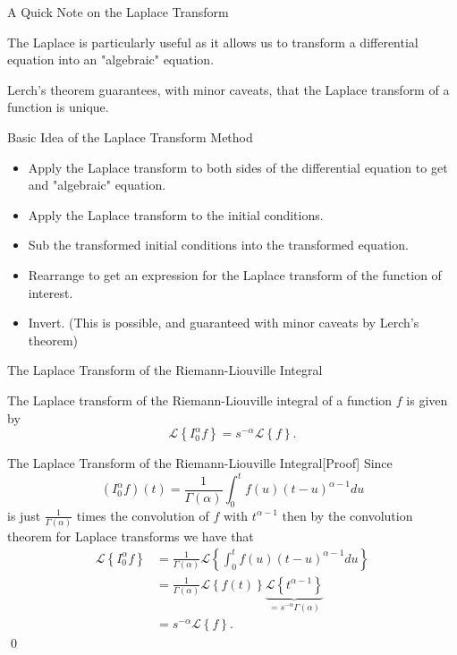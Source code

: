\documentclass[pdf]{beamer}
\begin{document}
\begin{frame}{A Quick Note on the Laplace Transform}
	
		
	
	The Laplace is particularly useful as it allows us to transform a differential equation into
	an "algebraic" equation. 
	
	Lerch's theorem guarantees, with minor caveats, that the Laplace transform of a function is
	unique.
	
\end{frame}

\begin{frame}{Basic Idea of the Laplace Transform Method}
	\begin{itemize}
		\item Apply the Laplace transform to both sides of the differential equation to get
		and "algebraic" equation.
		\item Apply the Laplace transform to the initial conditions. 
		\item Sub the transformed initial conditions into the transformed equation.
		\item Rearrange to get an expression for the Laplace transform of the function of interest.
		\item Invert. (This is possible, and guaranteed with minor caveats by Lerch's theorem)
	\end{itemize}
\end{frame}

\begin{frame}{The Laplace Transform of the Riemann-Liouville Integral}
	\begin{lemma}
	The Laplace transform of the Riemann-Liouville integral of a function $ f $ is given by
		$$ \mathcal{L} \left\{ I_0^\alpha f \right\}  = s^{-\alpha} \mathcal{L} \left\{ f \right\}.	$$
	\end{lemma}
\end{frame}

\begin{frame}{The Laplace Transform of the Riemann-Liouville Integral[Proof]}
	Since 
	$$
		 (I_0^\alpha f)(t) = \frac{1}{\Gamma(\alpha)} \int_0^t f(u) (t-u)^{\alpha - 1} du
	$$
	is just $ \frac{1}{\Gamma(\alpha)} $ times the convolution of $ f $ with $ t^{\alpha - 1} $ then by the convolution theorem
	for Laplace transforms we have that 
	\begin{align*}
		\mathcal{L} \left\{ I_0^\alpha f \right\} &= \frac{1}{\Gamma(\alpha)} \mathcal{L} \left\{ \int_{0}^{t} f(u) (t-u)^{\alpha - 1} du \right\} \\
			&= \frac{1}{\Gamma(\alpha)} \mathcal{L} \left\{ f(t) \right\} \underbrace{\mathcal{L} \left\{ t^{\alpha - 1} \right\}}_{=s^{-\alpha} \Gamma(\alpha)} \\
			&= s^{-\alpha} \mathcal{L} \left\{ f \right\}.
	\end{align*}
	\qed
\end{frame}
\end{document}
